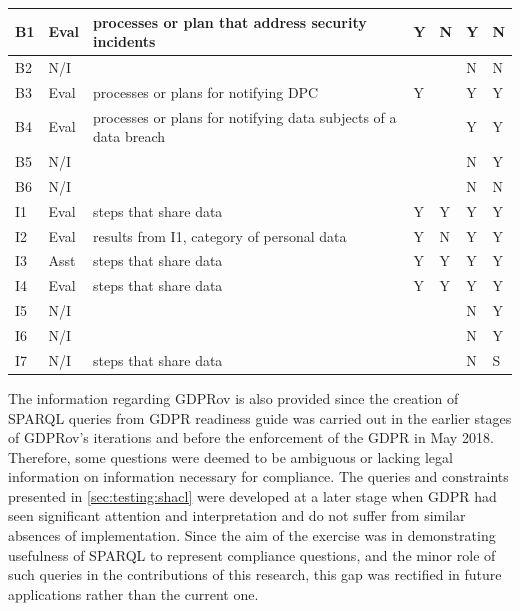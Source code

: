 \begin{table}[htbp]
\begin{tabularx}{\textwidth}{|l|l|X|l|l|l|l|}
B1 & Eval & processes or plan that address security incidents & Y & N & Y & N \\ \hline
B2 & N/I &  &  &  & N & N \\ \hline
B3 & Eval & processes or plans for notifying DPC & Y &  & Y & Y \\ \hline
B4 & Eval & processes or plans for notifying data subjects of a data breach &  &  & Y & Y \\ \hline
B5 & N/I &  &  &  & N & Y \\ \hline
B6 & N/I &  &  &  & N & N \\ \hline
I1 & Eval & steps that share data & Y & Y & Y & Y \\ \hline
I2 & Eval & results from I1, category of personal data & Y & N & Y & Y \\ \hline
I3 & Asst & steps that share data & Y & Y & Y & Y \\ \hline
I4 & Eval & steps that share data & Y & Y & Y & Y \\ \hline
I5 & N/I &  &  &  & N & Y \\ \hline
I6 & N/I &  &  &  & N & Y \\ \hline
I7 & N/I & steps that share data &  &  & N & S \\ \hline
\end{tabularx}
\label{table:sparql:dpc-2}
\end{table}

The information regarding GDPRov is also provided since the creation of SPARQL queries from GDPR readiness guide was carried out in the earlier stages of GDPRov's iterations and before the enforcement of the GDPR in May 2018. Therefore, some questions were deemed to be ambiguous or lacking legal information on information necessary for compliance.
The queries and constraints presented in \autoref{sec:testing:shacl} were developed at a later stage when GDPR had seen significant attention and interpretation and do not suffer from similar absences of implementation.
Since the aim of the exercise was in demonstrating usefulness of SPARQL to represent compliance questions, and the minor role of such queries in the contributions of this research, this gap was rectified in future applications rather than the current one.

